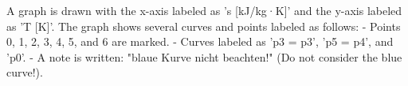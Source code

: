 A graph is drawn with the x-axis labeled as 's [kJ/kg·K]' and the y-axis labeled as 'T [K]'. The graph shows several curves and points labeled as follows:  
- Points 0, 1, 2, 3, 4, 5, and 6 are marked.  
- Curves labeled as 'p3 = p3', 'p5 = p4', and 'p0'.  
- A note is written: "blaue Kurve nicht beachten!" (Do not consider the blue curve!).